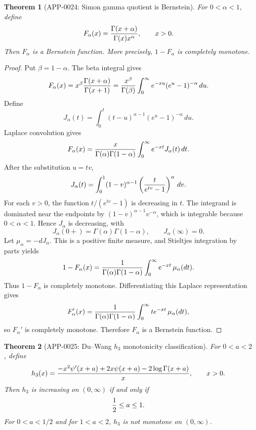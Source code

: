 \documentclass[11pt]{article}
\numberwithin{equation}{section}
\newtheorem{theorem}{Theorem}[section]
\theoremstyle{definition}
\theoremstyle{remark}
\newcommand{\1}{\mathbf 1}
\begin{document}
\begin{theorem}[APP-0024: Simon gamma quotient is Bernstein]
\label{thm:app24-simon-gamma-quotient}
For \(0<\alpha<1\), define
\[
  F_\alpha(x)={\Gamma(x+\alpha)\over \Gamma(x)x^\alpha},
  \qquad x>0 .
\]
Then \(F_\alpha\) is a Bernstein function.  More precisely,
\(1-F_\alpha\) is completely monotone.
\end{theorem}

\begin{proof}
Put \(\beta=1-\alpha\).  The beta integral gives
\[
 F_\alpha(x)
 =x^\beta{\Gamma(x+\alpha)\over\Gamma(x+1)}
 ={x^\beta\over\Gamma(\beta)}
   \int_0^\infty e^{-xu}(e^u-1)^{-\alpha}\,du .
\]
Define
\[
 J_\alpha(t)=\int_0^t (t-u)^{\alpha-1}(e^u-1)^{-\alpha}\,du .
\]
Laplace convolution gives
\[
 F_\alpha(x)
 ={x\over\Gamma(\alpha)\Gamma(1-\alpha)}
   \int_0^\infty e^{-xt}J_\alpha(t)\,dt .
\]
After the substitution \(u=tv\),
\[
J_\alpha(t)=
\int_0^1(1-v)^{\alpha-1}
\left({t\over e^{tv}-1}\right)^\alpha\,dv .
\]
For each \(v>0\), the function \(t/(e^{tv}-1)\) is decreasing in \(t\).
The integrand is dominated near the endpoints by
\((1-v)^{\alpha-1}v^{-\alpha}\), which is integrable because
\(0<\alpha<1\).  Hence \(J_\alpha\) is decreasing, with
\[
 J_\alpha(0+)=\Gamma(\alpha)\Gamma(1-\alpha),
 \qquad
 J_\alpha(\infty)=0 .
\]
Let \(\mu_\alpha=-dJ_\alpha\).  This is a positive finite measure, and
Stieltjes integration by parts yields
\[
 1-F_\alpha(x)
 ={1\over\Gamma(\alpha)\Gamma(1-\alpha)}
  \int_0^\infty e^{-xt}\,\mu_\alpha(dt).
\]
Thus \(1-F_\alpha\) is completely monotone.  Differentiating this Laplace
representation gives
\[
 F_\alpha'(x)
 ={1\over\Gamma(\alpha)\Gamma(1-\alpha)}
  \int_0^\infty t e^{-xt}\,\mu_\alpha(dt),
\]
so \(F_\alpha'\) is completely monotone.  Therefore \(F_\alpha\) is a
Bernstein function.
\end{proof}

\begin{theorem}[APP-0025: Du--Wang \(h_3\) monotonicity classification]
\label{thm:app25-du-wang-h3}
For \(0<a<2\), define
\[
 h_3(x)=
 {-x^2\psi'(x+a)+2x\psi(x+a)-2\log\Gamma(x+a)\over x},
 \qquad x>0 .
\]
Then \(h_3\) is increasing on \((0,\infty)\) if and only if
\[
  {1\over2}\le a\le1 .
\]
For \(0<a<1/2\) and for \(1<a<2\), \(h_3\) is not monotone on
\((0,\infty)\).
\end{theorem}
\end{document}

